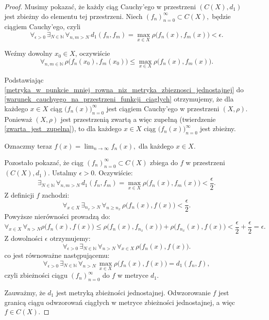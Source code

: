\documentclass[licencjacka]{pwr_wmat_praca_dyplomowa}
\theoremstyle{plain}
\numberwithin{theorem}{chapter}
\theoremstyle{definition}
\numberwithin{theorem}{chapter}
\begin{document}
\begin{proof}
Musimy pokazać, że każdy ciąg Cauchy'ego w przestrzeni $(C(X), d_1)$ jest zbieżny do elementu tej przestrzeni.
Niech $(f_n)_{n=0}^{\infty} \subset C(X),$ będzie ciągiem Cauchy'ego, czyli 
\begin{equation}
\label{warunek_cauchyego_na_przestrzeni_funkcji_ciaglych}
\forall_{\epsilon > 0} \, \exists_{N \in \mathbb{N}} \, \forall_{n,m > N} \, d_1(f_n, f_m) = \max_{x \in X} \rho\big(f_n(x), f_m(x)\big) < \epsilon.
\end{equation}

Weźmy dowolny $x_0 \in X$, oczywiście 
\begin{equation}
\label{metryka_w_punkcie_mniej_rowna_niz_metryka_zbieznosci_jednostajnej}
\forall_{n,m \in \mathbb{N}} \, \rho\big(f_n(x_0), f_m(x_0)\big) \leq \max_{x \in X} \rho\big(f_n(x), f_m(x)\big).
\end{equation}

Podstawiając \ref{metryka_w_punkcie_mniej_rowna_niz_metryka_zbieznosci_jednostajnej} do \ref{warunek_cauchyego_na_przestrzeni_funkcji_ciaglych} otrzymujemy, że dla każdego $x \in X$ ciąg $\big(f_n(x)\big)_{n=0}^{\infty}$ jest ciągiem Cauchy'ego w przestrzeni $(X, \rho).$ Ponieważ $(X, \rho)$ jest przestrzenią zwartą a więc zupełną (twierdzenie \ref{zwarta_jest_zupelna}), to dla każdego $x \in X$ ciąg $\big(f_n(x)\big)_{n=0}^{\infty}$ jest zbieżny.

Oznaczmy teraz $f(x) = \lim_{n \rightarrow \infty} f_n(x),$ dla każdego $x \in X.$ 


Pozostało pokazać, że ciąg $(f_n)_{n=0}^{\infty} \subset C(X)$ zbiega do $f$ w przestrzeni $(C(X), d_1).$ 
Ustalmy $\epsilon > 0.$ Oczywiście:
$$\exists_{N \in \mathbb{N}} \, \forall_{n,m > N} \, d_1(f_n, f_m) = \max_{x \in X} \rho\big(f_n(x), f_m(x)\big) < \frac{\epsilon}{2}.$$
Z definicji $f$ zachodzi: 
$$\forall_{x \in X} \, \exists_{n_x > N} \, \forall_{n \geq n_x} \, \rho\big(f_{n}(x), f(x)\big) < \frac{\epsilon}{2}.$$
Powyższe nierówności prowadzą do:
$$\forall_{x \in X} \, \forall_{n > N} \rho\big(f_n(x), f(x)\big) \leq \rho\big(f_n(x), f_{n_x}(x)\big) + \rho\big(f_{n_x}(x), f(x)\big) < \frac{\epsilon}{2} + \frac{\epsilon}{2} = \epsilon.$$
Z dowolności $\epsilon$ otrzymujemy:
$$\forall_{\epsilon > 0} \, \exists_{N \in \mathbb{N}} \, \forall_{n > N} \, \forall_{x \in X} \, \rho\big(f_n(x), f(x)\big).$$ 
co jest równoważne następującemu:
$$\forall_{\epsilon > 0} \, \exists_{N \in \mathbb{N}} \, \forall_{n > N} \, \max_{x \in X} \rho\big(f_n(x), f(x)\big) = d_1(f_n, f),$$ 
czyli zbieżności ciągu $(f_n)_{n=0}^{\infty}$ do $f$ w metryce $d_1.$


Zauważmy, że $d_1$ jest metryką zbieżności jednostajnej. Odwzorowanie $f$ jest granicą ciągu odwzorowań ciągłych w metryce zbieżności jednostajnej, a więc $f \in C(X).$
\end{proof}
\end{document}
